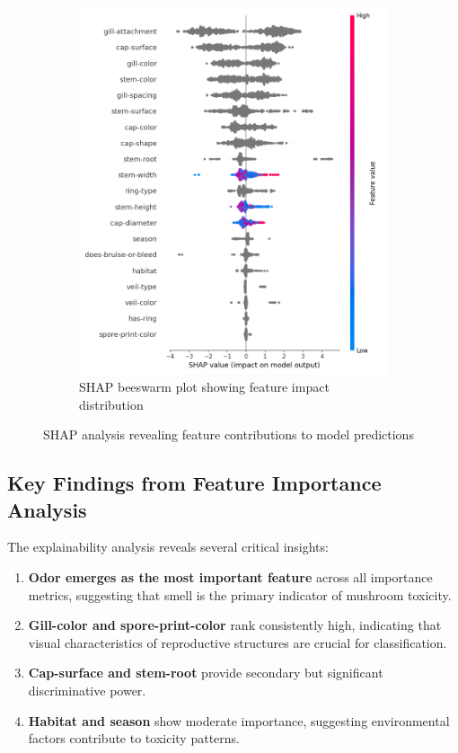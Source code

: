 \documentclass[11pt,a4paper]{article}
\begin{document}
\begin{figure}[H]
\begin{subfigure}{0.48\textwidth}
        \includegraphics[width=\textwidth]{figures/shap_beeswarm.png}
        \caption{SHAP beeswarm plot showing feature impact distribution}
    \end{subfigure}
    \caption{SHAP analysis revealing feature contributions to model predictions}
    \label{fig:shap_analysis}
\end{figure}

\subsection{Key Findings from Feature Importance Analysis}

The explainability analysis reveals several critical insights:

\begin{enumerate}
    \item \textbf{Odor emerges as the most important feature} across all importance metrics, suggesting that smell is the primary indicator of mushroom toxicity.
    
    \item \textbf{Gill-color and spore-print-color} rank consistently high, indicating that visual characteristics of reproductive structures are crucial for classification.
    
    \item \textbf{Cap-surface and stem-root} provide secondary but significant discriminative power.
    
    \item \textbf{Habitat and season} show moderate importance, suggesting environmental factors contribute to toxicity patterns.
\end{enumerate}
\end{document}
